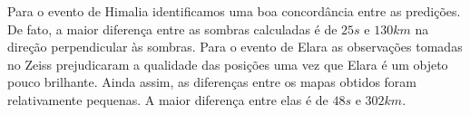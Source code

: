 \documentclass[12pt,a4paper]{report}
\begin{document}

Para o evento de Himalia identificamos uma boa concordância entre as predições. De fato, a maior diferença entre as sombras calculadas é de $25 s$ e $130 km$ na direção perpendicular às sombras. Para o evento de Elara as observações tomadas no Zeiss prejudicaram a qualidade das posições uma vez que Elara é um objeto pouco brilhante.
Ainda assim, as diferenças entre os mapas obtidos foram relativamente pequenas. A maior diferença entre elas é de $48 s$ e $302 km$.
\end{document}
